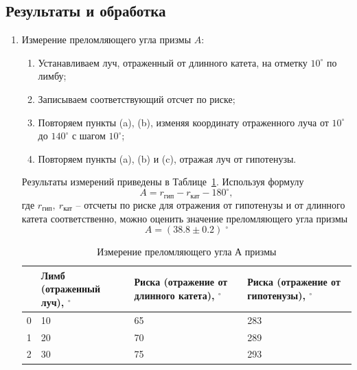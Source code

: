 \documentclass[12pt]{article}
\begin{document}
    \subsection*{Результаты и обработка}
    \begin{enumerate}
        \item Измерение преломляющего угла призмы $A$:
        \begin{enumerate}
            \item Устанавливаем луч, отраженный от длинного катета, на отметку $10^{\circ}$ по лимбу;
            \item Записываем соответствующий отсчет по риске;
            \item Повторяем пункты (a), (b),
            изменяя координату отраженного луча от $10^{\circ}$ до $140^{\circ}$ с шагом $10^{\circ}$;
            \item Повторяем пункты (a), (b) и (c), отражая луч от гипотенузы.
        \end{enumerate}
        Результаты измерений приведены в Таблице~\ref{tab:tab1}.
        Используя формулу \[A = r_{\text{гип}} - r_{\text{кат}} - 180^{\circ},\]
        где $r_{\text{гип}},\ r_{\text{кат}}$ -- отсчеты по риске для отражения от гипотенузы
        и от длинного катета соответственно, можно оценить значение преломляющего угла призмы
        \begin{equation*}
            A = (38.8 \pm 0.2)\;^{\circ}
        \end{equation*}
        \begin{table}[h]
            \centering
            \caption{Измерение преломляющего угла А призмы}
            \label{tab:tab1}
            \begin{tabular}{|p{0.5cm}|p{3cm}|p{4cm}|p{4cm}|}
                \hline
                {} & Лимб (отраженный луч), $^{\circ}$ & Риска (отражение от длинного катета), $^{\circ}$ & Риска (отражение от гипотенузы), $^{\circ}$ \\\hline
                0  & 10                                & 65                                               & 283                                         \\
                1  & 20                                & 70                                               & 289                                         \\
                2  & 30                                & 75                                               & 293                                         \\

\end{tabular}
\end{table}
\end{enumerate}
\end{document}
